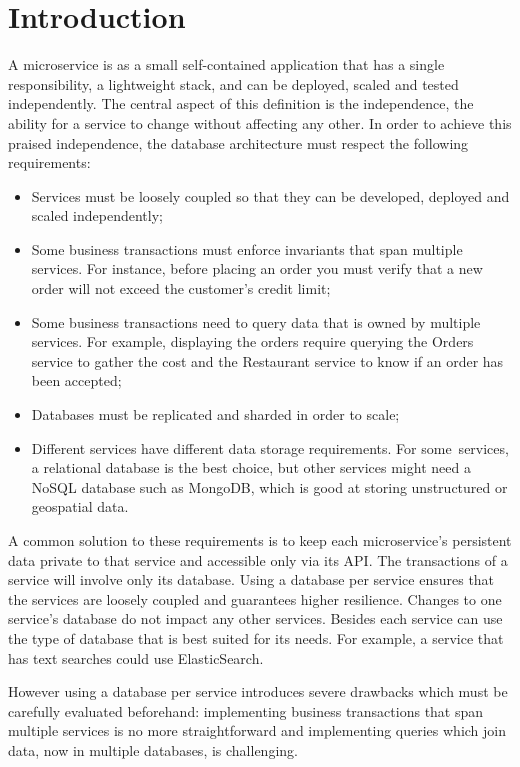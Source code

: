 \documentclass[conference]{IEEEtran}
\begin{document}
\section{Introduction}
A microservice is as a small self-contained application that has a single responsibility, a lightweight stack, and can be deployed, scaled and tested independently. \cite{exploring-microservices} The central aspect of this definition is the independence, the ability for a service to change without affecting any other.
In order to achieve this praised independence, the database architecture must respect the following requirements:
\begin{itemize}
  \item Services must be loosely coupled so that they can be developed, deployed and scaled independently;
  \item Some business transactions must enforce invariants that span multiple services. For instance, before placing an order you must verify that a new order will not exceed the customer’s credit limit;
  \item Some business transactions need to query data that is owned by multiple services. For example, displaying the orders require querying the Orders service to gather the cost and the Restaurant service to know if an order has been accepted;
  \item Databases must be replicated and sharded in order to scale;
  \item Different services have different data storage requirements. For some services, a relational database is the best choice, but other services might need a NoSQL database such as MongoDB, which is good at storing unstructured or geospatial data.
\end{itemize}

A common solution to these requirements is to keep each microservice’s persistent data private to that service and accessible only via its API. The transactions of a service will involve only its database. 
Using a database per service ensures that the services are loosely coupled and guarantees higher resilience. Changes to one service’s database do not impact any other services. Besides each service can use the type of database that is best suited for its needs. For example, a service that has text searches could use ElasticSearch. \cite{database-per-service} 

However using a database per service introduces severe drawbacks which must be carefully evaluated beforehand: implementing business transactions that span multiple services is no more straightforward and implementing queries which join data, now in multiple databases, is challenging.
\end{document}
